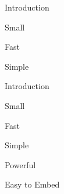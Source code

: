 

\begin{itemslide}{Introduction}
\pause \item Small
\pause \item Fast
\pause \item Simple
\end{itemslide}


\begin{itemslide}{Introduction}
\item Small
\item Fast
\item Simple
\item Powerful
\pause \item Easy to Embed
\end{itemslide}
